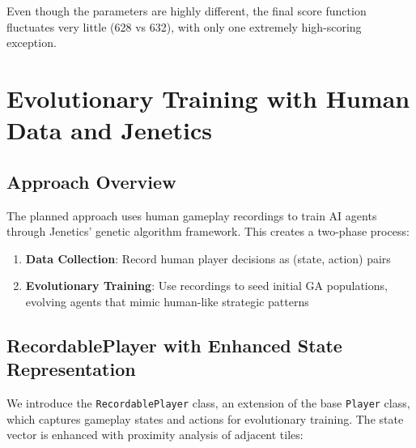 \documentclass[sigconf]{acmart} %
\begin{document}
Even though the parameters are highly different, the final score function fluctuates very little (628 vs 632), with only one extremely high-scoring exception.

\section{Evolutionary Training with Human Data and Jenetics}
\label{sec:evo_train}  %
\subsection{Approach Overview}
The planned approach uses human gameplay recordings to train AI agents through Jenetics' genetic algorithm framework. This creates a two-phase process:
\begin{enumerate}
	\item \textbf{Data Collection}: Record human player decisions as (state, action) pairs
	\item \textbf{Evolutionary Training}: Use recordings to seed initial GA populations, evolving agents that mimic human-like strategic patterns
\end{enumerate}

\subsection{RecordablePlayer with Enhanced State Representation}
\label{subsec:recordable_player}

We introduce the \texttt{RecordablePlayer} class, an extension of the base \texttt{Player} class, which captures gameplay states and actions for evolutionary training. The state vector is enhanced with proximity analysis of adjacent tiles:
\end{document}
